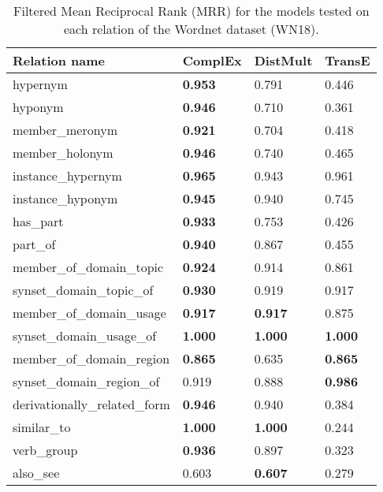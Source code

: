 \documentclass{article}
\begin{document}
\begin{table}
    \begin{tabular}{l|l@{\hspace{0.5em}}l@{}@{\hspace{0.5em}}l@{}}


        Relation name & ComplEx & DistMult & TransE\\ \hline
        hypernym  & \textbf{0.953} & 0.791 & 0.446 \\
        hyponym  & \textbf{0.946} & 0.710 & 0.361 \\
        member\_meronym  & \textbf{0.921} & 0.704 & 0.418 \\
        member\_holonym  & \textbf{0.946} & 0.740 & 0.465 \\
        instance\_hypernym  & \textbf{0.965} & 0.943 & 0.961 \\
        instance\_hyponym  & \textbf{0.945} & 0.940 & 0.745 \\
        has\_part  & \textbf{0.933} & 0.753 & 0.426 \\
        part\_of  & \textbf{0.940} & 0.867 & 0.455 \\
        member\_of\_domain\_topic  & \textbf{0.924} & 0.914 & 0.861 \\
        synset\_domain\_topic\_of  & \textbf{0.930} & 0.919 & 0.917 \\
        member\_of\_domain\_usage  & \textbf{0.917} & \textbf{0.917} & 0.875 \\
        synset\_domain\_usage\_of  & \textbf{1.000} & \textbf{1.000} & \textbf{1.000} \\
        member\_of\_domain\_region  & \textbf{0.865} & 0.635 & \textbf{0.865} \\
        synset\_domain\_region\_of  & 0.919 & 0.888 & \textbf{0.986} \\
        derivationally\_related\_form  & \textbf{0.946} & 0.940 & 0.384 \\
        similar\_to  & \textbf{1.000} & \textbf{1.000} & 0.244 \\
        verb\_group  & \textbf{0.936} & 0.897 & 0.323 \\
        also\_see  & 0.603 & \textbf{0.607} & 0.279 \\

\end{tabular}
    \caption{Filtered Mean Reciprocal Rank (MRR) for the models tested on each relation of the Wordnet dataset (WN18).}
    \label{tab:wn18_detailed_res}
    
    \vspace{-5mm}
\end{table}
\end{document}
